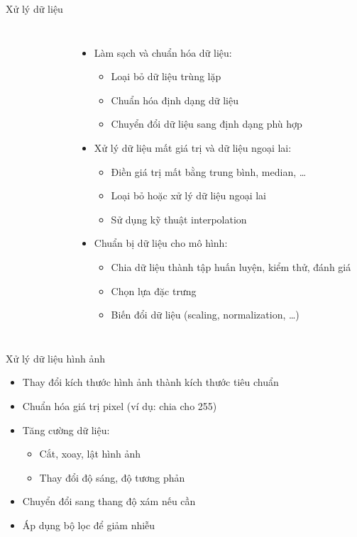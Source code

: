 \documentclass{beamer}
\begin{document}
\begin{frame}{Xử lý dữ liệu}
    \begin{columns}
        \begin{figure}
            \centering
        \end{figure}
        \begin{itemize}
            \item Làm sạch và chuẩn hóa dữ liệu:
            \begin{itemize}
                \item Loại bỏ dữ liệu trùng lặp
                \item Chuẩn hóa định dạng dữ liệu
                \item Chuyển đổi dữ liệu sang định dạng phù hợp
            \end{itemize}
            \item Xử lý dữ liệu mất giá trị và dữ liệu ngoại lai:
            \begin{itemize}
                \item Điền giá trị mất bằng trung bình, median, \dots
                \item Loại bỏ hoặc xử lý dữ liệu ngoại lai
                \item Sử dụng kỹ thuật interpolation
            \end{itemize}
            \item Chuẩn bị dữ liệu cho mô hình:
            \begin{itemize}
                \item Chia dữ liệu thành tập huấn luyện, kiểm thử, đánh giá
                \item Chọn lựa đặc trưng
                \item Biến đổi dữ liệu (scaling, normalization, \dots)
            \end{itemize}
        \end{itemize}
    \end{columns}
\end{frame}

\begin{frame}{Xử lý dữ liệu hình ảnh}
    \begin{itemize}
        \item Thay đổi kích thước hình ảnh thành kích thước tiêu chuẩn
        \item Chuẩn hóa giá trị pixel (ví dụ: chia cho 255)
        \item Tăng cường dữ liệu:
        \begin{itemize}
            \item Cắt, xoay, lật hình ảnh
            \item Thay đổi độ sáng, độ tương phản
        \end{itemize}
        \item Chuyển đổi sang thang độ xám nếu cần
        \item Áp dụng bộ lọc để giảm nhiễu
    \end{itemize}
\end{frame}
\end{document}
